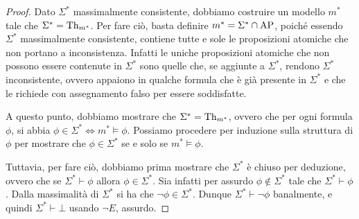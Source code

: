 \begin{proof}
  Dato \(\Sigma^*\) massimalmente consistente, dobbiamo costruire un modello \(m^*\) tale che \(\Sigma^* = \operatorname{Th}_{m^*}\).
  Per fare ciò, basta definire \(m^* = \Sigma^*\cap\AP\), poiché essendo \(\Sigma^*\) massimalmente consistente, contiene tutte e sole le proposizioni atomiche che non portano a inconsistenza.
  Infatti le uniche proposizioni atomiche che non possono essere contenute in \(\Sigma^*\) sono quelle che, se aggiunte a \(\Sigma^*\), rendono \(\Sigma^*\) inconsistente, ovvero appaiono in qualche formula che è già presente in \(\Sigma^*\) e che le richiede con assegnamento falso per essere soddisfatte.

  A questo punto, dobbiamo mostrare che \(\Sigma^* = \operatorname{Th}_{m^*}\), ovvero che per ogni formula \(\phi\), si abbia \(\phi \in \Sigma^* \iff m^* \models \phi\).
  Possiamo procedere per induzione sulla struttura di \(\phi\) per mostrare che \(\phi \in \Sigma^*\) se e solo se \(m^*\models\phi\).

  Tuttavia, per fare ciò, dobbiamo prima mostrare che \(\Sigma^*\) è chiuso per deduzione, ovvero che se \(\Sigma^*\vdash\phi\) allora \(\phi\in\Sigma^*\).
  Sia infatti per assurdo \(\phi\not\in\Sigma^*\) tale che \(\Sigma^*\vdash\phi\). Dalla massimalità di \(\Sigma^*\) si ha che \(\neg\phi\in\Sigma^*\). Dunque \(\Sigma^*\vdash\neg\phi\) banalmente, e quindi \(\Sigma^*\vdash\bot\) usando \(\neg E\), assurdo.
  

\end{proof}
